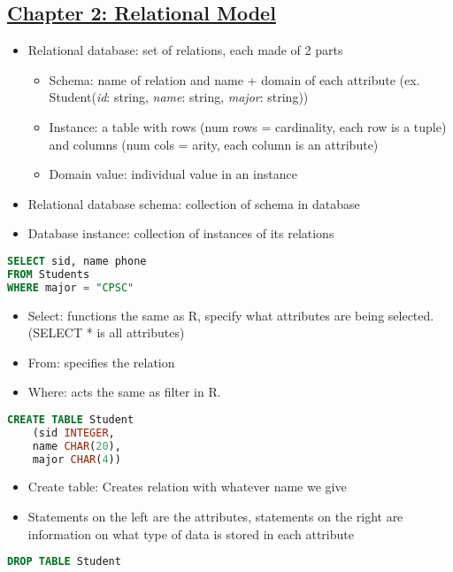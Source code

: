 \documentclass[8pt,landscape,a4paper, fleqn, dvipsnames]{extarticle}
\begin{document}
\begin{multicols*}{4}
\section*{\ul{Chapter 2: Relational Model}}
\begin{itemize}
    \item Relational database: set of relations, each made of 2 parts
    \begin{itemize}
        \item Schema: name of relation and name + domain of each attribute (ex. Student(\textit{id}: string, \textit{name}: string, \textit{major}: string))
        \item Instance: a table with rows (num rows = cardinality, each row is a tuple) and columns (num cols = arity, each column is an attribute)
        \item Domain value: individual value in an instance
    \end{itemize}
    \item Relational database schema: collection of schema in database
    \item Database instance: collection of instances of its relations
\end{itemize}
\begin{lstlisting}[language = SQL]
SELECT sid, name phone
FROM Students
WHERE major = "CPSC"
\end{lstlisting}
\begin{itemize}
    \item Select: functions the same as R, specify what attributes are being selected. (SELECT * is all attributes)
    \item From: specifies the relation
    \item Where: acts the same as filter in R.
\end{itemize}
\begin{lstlisting}[language = SQL]
CREATE TABLE Student
    (sid INTEGER,
    name CHAR(20),
    major CHAR(4))
\end{lstlisting}
\begin{itemize}
    \item Create table: Creates relation with whatever name we give
    \item Statements on the left are the attributes, statements on the right are information on what type of data is stored in each attribute
\end{itemize}
\begin{lstlisting}[language = SQL]
DROP TABLE Student
\end{lstlisting}

\end{multicols*}
\end{document}

